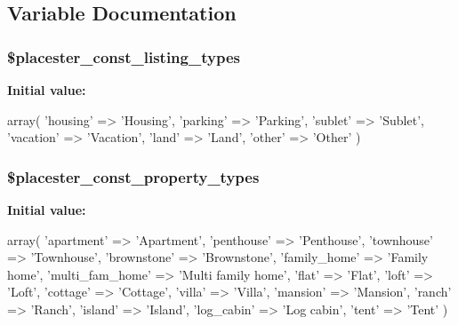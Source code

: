 \subsection{Variable Documentation}
\hypertarget{const_8php_ab3c50e93ac45d1f7185c74f2ba00fd11}{
\subsubsection[{\$placester\_\-const\_\-listing\_\-types}]{\setlength{\rightskip}{0pt plus 5cm}\$placester\_\-const\_\-listing\_\-types}}
\label{d0/d02/const_8php_ab3c50e93ac45d1f7185c74f2ba00fd11}
{\bfseries Initial value:}
\begin{DoxyCode}
 
    array(
        'housing' => 'Housing',
        'parking' => 'Parking',
        'sublet' => 'Sublet',
        'vacation' => 'Vacation',
        'land' => 'Land',
        'other' => 'Other'
    )
\end{DoxyCode}
\hypertarget{const_8php_ad6a28f759645d7ccdcadc88cbfddc555}{
\subsubsection[{\$placester\_\-const\_\-property\_\-types}]{\setlength{\rightskip}{0pt plus 5cm}\$placester\_\-const\_\-property\_\-types}}
\label{d0/d02/const_8php_ad6a28f759645d7ccdcadc88cbfddc555}
{\bfseries Initial value:}
\begin{DoxyCode}
 
    array(
        'apartment' => 'Apartment',
        'penthouse' => 'Penthouse',
        'townhouse' => 'Townhouse',
        'brownstone' => 'Brownstone',
        'family_home' => 'Family home',
        'multi_fam_home' => 'Multi family home',
        'flat' => 'Flat',
        'loft' => 'Loft',
        'cottage' => 'Cottage',
        'villa' => 'Villa',
        'mansion' => 'Mansion',
        'ranch' => 'Ranch',
        'island' => 'Island',
        'log_cabin' => 'Log cabin',
        'tent' => 'Tent'
    )
\end{DoxyCode}


